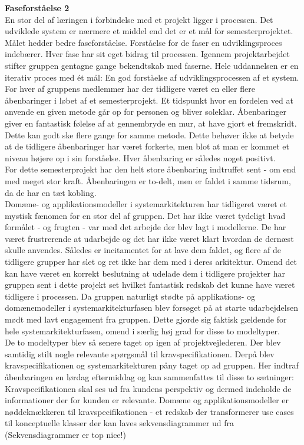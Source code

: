 \textbf{Faseforståelse 2}\\
En stor del af læringen i forbindelse med et projekt ligger i processen. Det udviklede system er nærmere et middel end det er et mål for semesterprojektet. Målet hedder bedre faseforståelse. Forståelse for de faser en udviklingsproces indebærer. Hver fase har sit eget bidrag til processen. Igennem projektarbejdet stifter gruppen gentagne gange bekendtskab med faserne. Hele uddannelsen er en iterativ proces med ét mål: En god forståelse af udviklingsprocessen af et system.\\
For hver af gruppens medlemmer har der tidligere været en eller flere åbenbaringer i løbet af et semesterprojekt. Et tidspunkt hvor en fordelen ved at anvende en given metode går op for personen og bliver soleklar. Åbenbaringer giver en fantastisk følelse af at gennembryde en mur, at have gjort et fremskridt. Dette kan godt ske flere gange for samme metode. Dette behøver ikke at betyde at de tidligere åbenbaringer har været forkerte, men blot at man er kommet et niveau højere op i sin forståelse. Hver åbenbaring er således noget positivt.\\
For dette semesterprojekt har den helt store åbenbaring indtruffet sent - om end med meget stor kraft.
Åbenbaringen er to-delt, men er faldet i samme tidsrum, da de har en tæt kobling.\\
Domæne- og applikationsmodeller i systemarkitekturen har tidligeret været et mystisk fænomen for en stor del af gruppen. Det har ikke været tydeligt hvad formålet - og frugten - var med det arbejde der blev lagt i modellerne. De har været frustrerende at udarbejde og det har ikke været klart hvordan de dernæst skulle anvendes. Således er incitamentet for at lave dem faldet, og flere af de tidligere grupper har slet og ret ikke har dem med i deres arkitektur. Omend det kan have været en korrekt beslutning  at udelade dem i tidligere projekter har gruppen sent i dette projekt set hvilket fantastisk redskab det kunne have været tidligere i processen. Da gruppen naturligt stødte på applikations- og domænemodeller i systemarkitekturfasen blev forsøget på at starte udarbejdelsen mødt med lavt engagement fra gruppen. Dette gjorde sig faktisk gældende for hele systemarkitekturfasen, omend i særlig høj grad for disse to modeltyper.\\
De to modeltyper blev så senere taget op igen af projektvejlederen. Der blev samtidig stilt nogle relevante spørgsmål til kravspecifikationen. Derpå blev kravspecifikationen og systemarkitekturen påny taget op ad gruppen. Her indtraf åbenbaringen en lørdag eftermiddag og kan sammenfattes til disse to sætninger:\\
Kravspecifikationen skal ses ud fra kundens perspektiv og dermed indeholde de informationer der for kunden er relevante.
Domæne og applikationsmodeller er nøddeknækkeren til kravspecifikationen - et redskab der transformerer use cases til konceptuelle klasser der kan laves sekvensdiagrammer ud fra (Sekvensdiagrammer er top nice!)\\

